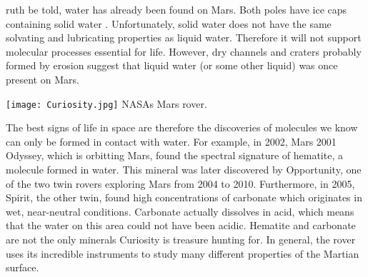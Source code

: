 ruth be told, water has already been found on Mars.
Both poles have ice caps containing solid water \cite{MARSwater}.
Unfortunately, solid water does not have the same solvating and lubricating properties as liquid water. Therefore it will not support molecular processes essential for life.
However, dry channels and craters probably formed by erosion suggest that liquid water (or some other liquid) was once present on Mars.

\begin{center}
	\texttt{[image: Curiosity.jpg]}
	NASAs Mars rover.
\end{center}

The best signs of life in space are therefore the discoveries of molecules we know can only be formed in contact with water.
For example, in 2002, Mars 2001 Odyssey, which is orbitting Mars, found the spectral signature of hematite, a molecule formed in water.
This mineral was later discovered by Opportunity, one of the two twin rovers exploring Mars from 2004 to 2010.
Furthermore, in 2005, Spirit, the other twin, found high concentrations of carbonate which originates in wet, near-neutral conditions. 
Carbonate actually dissolves in acid, which means that the water on this area could not have been acidic.
Hematite and carbonate are not the only minerals Curiosity is treasure hunting for.
In general, the rover uses its incredible instruments to study many different properties of the Martian surface.